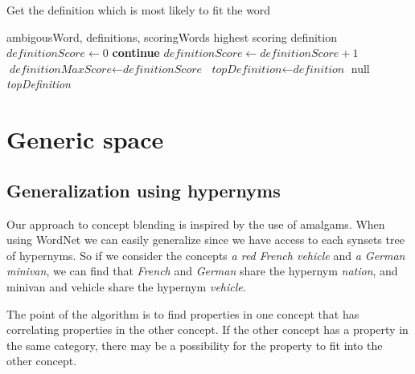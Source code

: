 \begin{algorithm}
	\caption{Get the definition which is most likely to fit the word}\label{euclid}
	\begin{algorithmic}[1]
		\Require ambigousWord,
		definitions,
		scoringWords
		\Ensure highest scoring definition
		\State $\textit{definitionScore} \gets 0$
		\State \textbf{continue}
		\EndIf
		\State ${\textit{definitionScore} \gets {\textit{definitionScore}+1}}$
		\EndIf
		\EndFor
		\EndFor
		\State ${\textit{definitionMaxScore}} \gets {\textit{definitionScore}}$
		\State ${\textit{topDefinition}} \gets {\textit{definition}}$
		\EndIf
		\EndFor
		\Return null
		\EndIf
		\State \Return \textit{topDefinition}
		\EndProcedure
	\end{algorithmic}
\end{algorithm}


\section{Generic space}
\subsection{Generalization using hypernyms}
Our approach to concept blending is inspired by the use of amalgams. When using WordNet we can easily generalize since we have access to each synsets tree of hypernyms. So if we consider the concepts \emph{a red French vehicle} and \emph{a German minivan}, we can find that \emph{French} and \emph{German} share the hypernym \emph{nation}, and minivan and vehicle share the hypernym \emph{vehicle}.

The point of the algorithm is to find properties in one concept that has correlating properties in the other concept. If the other concept has a property in the same category, there may be a possibility for the property to fit into the other concept.

